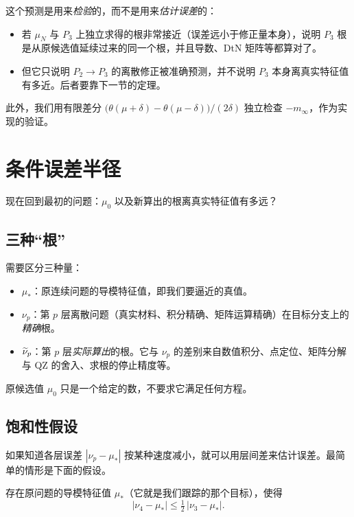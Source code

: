\documentclass[11pt,a4paper,fontset=fandol]{ctexart}
\begin{document}
这个预测是用来\emph{检验}的，而不是用来\emph{估计误差}的：
\begin{itemize}
\item 若 $\mu_N$ 与 $P_3$ 上独立求得的根非常接近（误差远小于修正量本身），说明 $P_3$ 根是从原候选值延续过来的同一个根，并且导数、DtN 矩阵等都算对了。
\item 但它只说明 $P_2\to P_3$ 的离散修正被准确预测，并不说明 $P_3$ 本身离真实特征值有多近。后者要靠下一节的定理。
\end{itemize}
此外，我们用有限差分 $\bigl(\theta(\mu+\delta)-\theta(\mu-\delta)\bigr)/(2\delta)$ 独立检查 $-m_\infty$，作为实现的验证。

\section{条件误差半径}
\label{sec:radius}

现在回到最初的问题：$\mu_0$ 以及新算出的根离真实特征值有多远？

\subsection{三种“根”}

需要区分三种量：
\begin{itemize}
\item $\mu_*$：原连续问题的导模特征值，即我们要逼近的真值。
\item $\nu_p$：第 $p$ 层离散问题（真实材料、积分精确、矩阵运算精确）在目标分支上的\emph{精确}根。
\item $\widetilde\nu_p$：第 $p$ 层\emph{实际算出}的根。它与 $\nu_p$ 的差别来自数值积分、点定位、矩阵分解与 QZ 的舍入、求根的停止精度等。
\end{itemize}
原候选值 $\mu_0$ 只是一个给定的数，不要求它满足任何方程。

\subsection{饱和性假设}

如果知道各层误差 $|\nu_p-\mu_*|$ 按某种速度减小，就可以用层间差来估计误差。最简单的情形是下面的假设。

\begin{assumption}[饱和性]
\label{ass:S}
存在原问题的导模特征值 $\mu_*$（它就是我们跟踪的那个目标），使得
\[
|\nu_4-\mu_*|\le\tfrac12\,|\nu_3-\mu_*| .
\]
\end{assumption}
\end{document}
